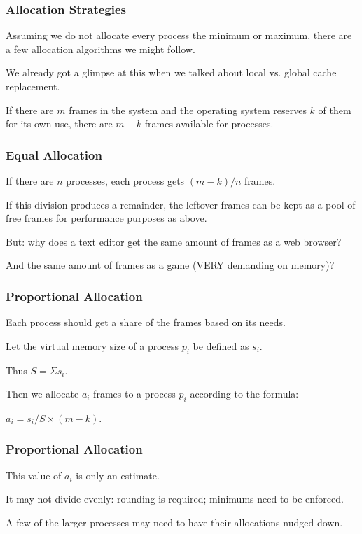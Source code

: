 \begin{frame}
\frametitle{Allocation Strategies}

Assuming we do not allocate every process the minimum or maximum, there are a few allocation algorithms we might follow. 

We already got a glimpse at this when we talked about local vs. global cache replacement.

If there are $m$ frames in the system and the operating system reserves $k$ of them for its own use, there are $m-k$ frames available for processes.

\end{frame}

\begin{frame}
\frametitle{Equal Allocation}

If there are $n$ processes, each process gets $(m-k)/n$ frames. 

If this division produces a remainder, the leftover frames can be kept as a pool of free frames for performance purposes as above. 

But: why does a text editor get the same amount of frames as a web browser?

And the same amount of frames as a game (VERY demanding on memory)?


\end{frame}

\begin{frame}
\frametitle{Proportional Allocation}

Each process should get a share of the frames based on its needs. 

Let the virtual memory size of a process $p_{i}$ be defined as $s_{i}$. 

Thus $S = \Sigma s_{i}$. 

Then we allocate $a_{i}$ frames to a process $p_{i}$ according to the formula: 

$a_{i} = s_{i} / S \times (m - k)$.

\end{frame}

\begin{frame}
\frametitle{Proportional Allocation}

This value of $a_{i}$ is only an estimate. 

It may not divide evenly: rounding is required; minimums need to be enforced.

A few of the larger processes may need to have their allocations nudged down.


\end{frame}


